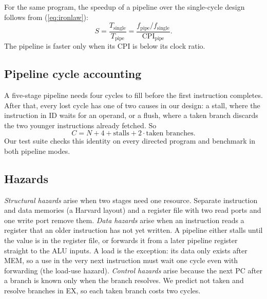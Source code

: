 For the same program, the speedup of a pipeline over the single-cycle design
follows from (\ref{eq:ironlaw}):
\begin{equation}
S = \frac{T_{\text{single}}}{T_{\text{pipe}}} =
\frac{f_{\text{pipe}} / f_{\text{single}}}{\mathrm{CPI}_{\text{pipe}}}.
\label{eq:speedup}
\end{equation}
The pipeline is faster only when its CPI is below its clock ratio.

\subsection{Pipeline cycle accounting}
A five-stage pipeline needs four cycles to fill before the first instruction
completes. After that, every lost cycle has one of two causes in our design:
a stall, where the instruction in ID waits for an operand, or a flush, where
a taken branch discards the two younger instructions already fetched. So
\begin{equation}
C = N + 4 + \text{stalls} + 2 \cdot \text{taken branches}.
\label{eq:cycles}
\end{equation}
Our test suite checks this identity on every directed program and benchmark in both pipeline modes.

\subsection{Hazards}
\emph{Structural hazards} arise when two stages need one resource. Separate
instruction and data memories (a Harvard layout) and a register file with two
read ports and one write port remove them.
\emph{Data hazards} arise when an instruction reads a register that an older
instruction has not yet written. A pipeline either stalls until the value is
in the register file, or forwards it from a later pipeline register straight
to the ALU inputs. A load is the exception: its data only exists after MEM,
so a use in the very next instruction must wait one cycle even with
forwarding (the load-use hazard).
\emph{Control hazards} arise because the next PC after a branch is known only
when the branch resolves. We predict not taken and resolve branches in EX, so
each taken branch costs two cycles.
